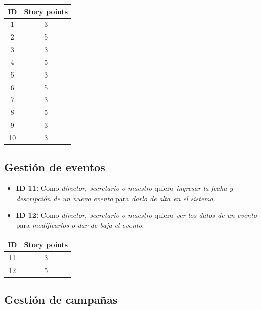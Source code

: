 \documentclass[a4paper, 10pt, twoside]{article}
\newenvironment{stories}{
  \begin{itemize}
}{
  \end{itemize}
}
\newcommand{\story}[4]{
  \item
  \textbf{ID #1:} Como \emph{#2} quiero \emph{#3} para \emph{#4}.
}
\begin{document}
\begin{center}
\begin{tabular}{|c|c|}
\hline
ID & Story points\\
\hline
1  & 3\\
2  & 5\\
3  & 3\\
4  & 5\\
5  & 3\\
6  & 5\\
7  & 3\\
8  & 5\\
9  & 3\\
10 & 3\\
\hline
\end{tabular}
\end{center}


\subsection{Gestión de eventos}

\begin{stories}
  \story{11}{director, secretario o maestro}
        {ingresar la fecha y descripción de un nuevo evento}
        {darlo de alta en el sistema}

  \story{12}{director, secretario o maestro}
        {ver los datos de un evento}
        {modificarlos o dar de baja el evento}
\end{stories}

\begin{center}
\begin{tabular}{|c|c|}
\hline
ID & Story points\\
\hline
11 & 3\\
12 & 5\\
\hline
\end{tabular}
\end{center}


\subsection{Gestión de campañas}
\end{document}
